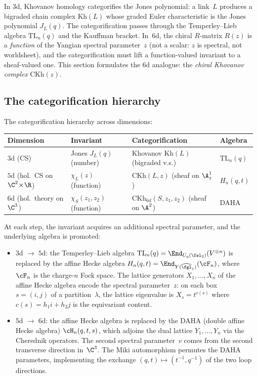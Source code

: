 In $3$d, Khovanov homology categorifies the Jones polynomial: a link~$L$ produces a bigraded chain complex $\mathrm{Kh}(L)$ whose graded Euler characteristic is the Jones polynomial $J_L(q)$. The categorification passes through the Temperley--Lieb algebra $\mathrm{TL}_n(q)$ and the Kauffman bracket. In~$6$d, the chiral $R$-matrix $R(z)$ is a \emph{function} of the Yangian spectral parameter~$z$ (not a scalar: $z$ is spectral, not worldsheet), and the categorification must lift a function-valued invariant to a sheaf-valued one. This section formulates the $6$d analogue: the \emph{chiral Khovanov complex} $\mathrm{CKh}(z)$.

\subsection{The categorification hierarchy}
\label{subsec:cat-hierarchy}

The categorification hierarchy across dimensions:
\begin{center}
\renewcommand{\arraystretch}{1.3}
\begin{tabular}{llll}
\toprule
\textbf{Dimension} & \textbf{Invariant} & \textbf{Categorification} & \textbf{Algebra} \\
\midrule
$3$d (CS) & Jones $J_L(q)$ (number) & Khovanov $\mathrm{Kh}(L)$ (bigraded v.s.) & $\mathrm{TL}_n(q)$ \\
$5$d (hol.\ CS on $\C^2 \!\times\! \R$) & $\chi_L(z)$ (function) & $\mathrm{CKh}(L, z)$ (sheaf on $\A^1_z$) & $H_n(q,t)$ \\
$6$d (hol.\ theory on $\C^3$) & $\chi_S(z_1, z_2)$ (function) & $\mathrm{CKh}_{6d}(S, z_1, z_2)$ (sheaf on $\A^2$) & DAHA \\
\bottomrule
\end{tabular}
\end{center}

At each step, the invariant acquires an additional spectral parameter, and the underlying algebra is promoted:
\begin{itemize}
 \item $3$d $\to$ $5$d: the Temperley--Lieb algebra $\mathrm{TL}_n(q) = \End_{U_q(\fsl_2)}(V^{\otimes n})$ is replaced by the affine Hecke algebra $H_n(q,t) = \End_{Y(\widehat{\fgl}_1)}(\cF_n)$, where $\cF_n$ is the charge-$n$ Fock space. The lattice generators $X_1, \ldots, X_n$ of the affine Hecke algebra encode the spectral parameter~$z$: on each box~$s = (i,j)$ of a partition~$\lambda$, the lattice eigenvalue is $X_s = t^{c(s)}$ where $c(s) = h_1 i + h_2 j$ is the equivariant content.
 \item $5$d $\to$ $6$d: the affine Hecke algebra is replaced by the DAHA (double affine Hecke algebra) $\cH_n(q,t,s)$, which adjoins the dual lattice $Y_1, \ldots, Y_n$ via the Cherednik operators. The second spectral parameter~$v$ comes from the second transverse direction in~$\C^3$. The Miki automorphism permutes the DAHA parameters, implementing the exchange $(q, t) \mapsto (t^{-1}, q^{-1})$ of the two loop directions.
\end{itemize}

